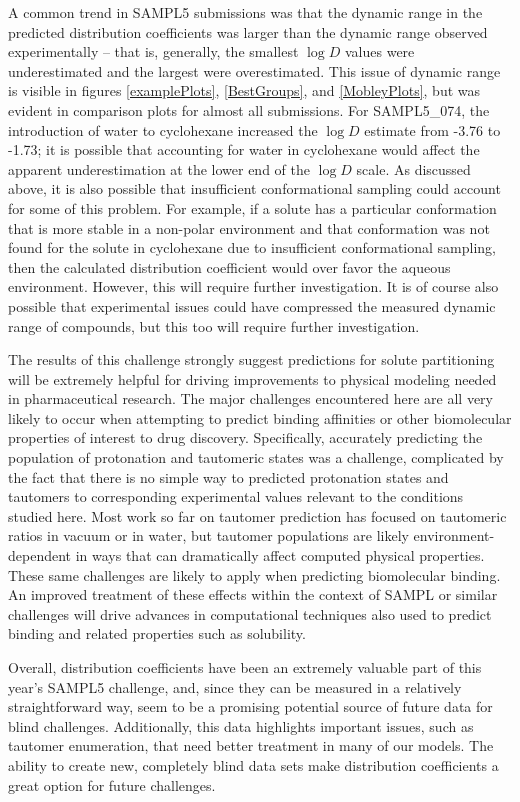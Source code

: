 A common trend in SAMPL5 submissions was that the dynamic range in the predicted distribution coefficients was larger than the dynamic range observed experimentally -- that is, generally, the smallest $\log D$ values were underestimated and the largest were overestimated. 
This issue of dynamic range is visible in figures \ref{examplePlots}, \ref{BestGroups}, and \ref{MobleyPlots}, but was evident in comparison plots for almost all submissions.
For SAMPL5\_074, the introduction of water to cyclohexane increased the $\log D$ estimate from -3.76 to -1.73; it is possible that accounting for water in cyclohexane would affect the apparent underestimation at the lower end of the $\log D$ scale. 
As discussed above, it is also possible that insufficient conformational sampling could account for some of this problem. 
For example, if a solute has a particular conformation that is more stable in a non-polar environment and that conformation was not found for the solute in cyclohexane due to insufficient conformational sampling, then the calculated distribution coefficient would over favor the aqueous environment. 
However, this will require further investigation. 
It is of course also possible that experimental issues could have compressed the measured dynamic range of compounds, but this too will require further investigation.

The results of this challenge strongly suggest predictions for solute partitioning will be extremely helpful for driving improvements to physical modeling needed in pharmaceutical research. 
The major challenges encountered here are all very likely to occur when attempting to predict binding affinities or other biomolecular properties of interest to drug discovery. 
Specifically, accurately predicting the population of protonation and tautomeric states was a challenge, complicated by the fact that there is no simple way to predicted protonation states and tautomers to corresponding experimental values relevant to the conditions studied here. 
Most work so far on tautomer prediction has focused on tautomeric ratios in vacuum or in water, but tautomer populations are likely environment-dependent in ways that can dramatically affect computed physical properties. 
These same challenges are likely to apply when predicting biomolecular binding. 
An improved treatment of these effects within the context of SAMPL or similar challenges will drive advances in computational techniques also used to predict binding and related properties such as solubility.  

Overall, distribution coefficients have been an extremely valuable part of this year's SAMPL5 challenge, and, since they can be measured in a relatively straightforward way, seem to be a promising potential source of future data for blind challenges.  
Additionally, this data highlights important issues, such as tautomer enumeration, that need better treatment in many of our models.
The ability to create new, completely blind data sets make distribution coefficients a great option for future challenges. 

